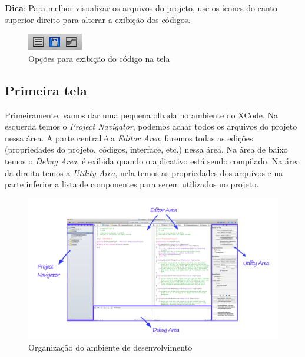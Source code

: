 \documentclass[a4paper,12pt,brazil,doubleside]{book}
\begin{document}
\begin{singlespace}
\begin{framed}

\textbf{Dica}: Para melhor visualizar os arquivos do projeto, use os ícones do canto superior direito para alterar a exibição dos códigos.
\end{framed}

\begin{figure}[H]
  \centering
  \includegraphics[scale=1]{figuras/3/tela_opcao_exibicao.png}
  \caption{Opções para exibição do código na tela}
  \label{fig:a}
\end{figure}

\subsection{Primeira tela}


Primeiramente, vamos dar uma pequena olhada no ambiente do XCode. Na esquerda temos o \emph{Project Navigator}, podemos achar todos os arquivos do projeto nessa área. A parte central é a \emph{Editor Area}, faremos todas as edições (propriedades do projeto, códigos, interface, etc.) nessa área. Na área de baixo temos o \emph{Debug Area}, é exibida quando o aplicativo está sendo compilado. Na área da direita temos a \emph{Utility Area}, nela temos as propriedades dos arquivos e na parte inferior a lista de componentes para serem utilizados no projeto.

\begin{figure}[H]
  \centering
  \includegraphics[width=.99\textwidth]{figuras/3/tela_principal_xcode.png}
  \caption{Organização do ambiente de desenvolvimento}
  \label{fig:a}
\end{figure}



\end{singlespace}
\end{document}
